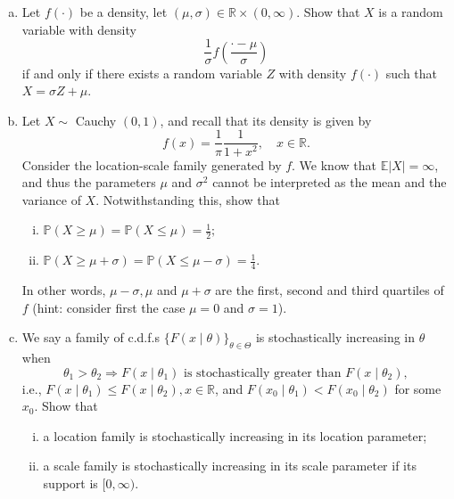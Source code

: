 \begin{ex}
    \begin{enumerate}[(a)]
        \item Let \(f(\cdot)\) be a density, let \((\mu, \sigma) \in \mathbb{R} \times(0, \infty)\). Show that \(X\) is a random variable with density
        \[
        \frac{1}{\sigma} f\left(\frac{\cdot-\mu}{\sigma}\right)
        \]
        if and only if there exists a random variable \(Z\) with density \(f(\cdot)\) such that \(X=\sigma Z+\mu\).
        \item Let \(X \sim\) Cauchy \((0,1)\), and recall that its density is given by
        \[
        f(x)=\frac{1}{\pi} \frac{1}{1+x^{2}}, \quad x \in \mathbb{R} .
        \]
        Consider the location-scale family generated by \(f\). We know that \(\mathbb{E}|X|=\infty\), and thus the parameters \(\mu\) and \(\sigma^{2}\) cannot be interpreted as the mean and the variance of \(X\). Notwithstanding this, show that
        \begin{enumerate}[(i)]
            \item \(\mathbb{P}(X \geq \mu)=\mathbb{P}(X \leq \mu)=\frac{1}{2} ;\)
            \item \(\mathbb{P}(X \geq \mu+\sigma)=\mathbb{P}(X \leq \mu-\sigma)=\frac{1}{4}\). 
        \end{enumerate}  In other words, \(\mu-\sigma, \mu\) and \(\mu+\sigma\) are the first, second and third quartiles of \(f\) (hint: consider first the case \(\mu=0\) and \(\sigma=1\)). 
        \item We say a family of c.d.f.s \(\{F(x \mid \theta)\}_{\theta \in \Theta}\) is stochastically increasing in \(\theta\) when \[\theta_{1}>\theta_{2}\Rightarrow F\left(x \mid \theta_{1}\right)\text{ is stochastically greater than }F\left(x \mid \theta_{2}\right), \]i.e., \(F\left(x \mid \theta_{1}\right) \leq F\left(x \mid \theta_{2}\right), x \in \mathbb{R}\), and \(F\left(x_{0} \mid \theta_{1}\right)<F\left(x_{0} \mid \theta_{2}\right)\) for some \(x_{0}\). Show that 
        \begin{enumerate}[(i)]
            \item a location family is stochastically increasing in its location parameter; 
            \item a scale family is stochastically increasing in its scale parameter if its support is \([0, \infty)\).
        \end{enumerate}
    \end{enumerate}
\end{ex}

